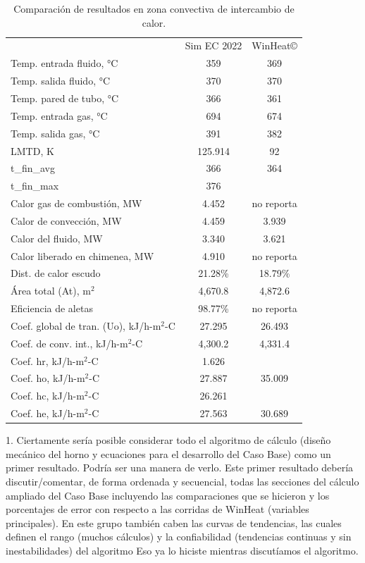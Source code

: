 \begin{table}
\begin{center}
\caption[Resultados en zona convectiva de intercambio de calor]{Comparación de resultados en zona convectiva de intercambio de calor.}
\label{tbl:compara-zc}
\begin{tabular}{l|c|c}
	& Sim EC 2022 & WinHeat\copyright \\
Temp. entrada fluido, °C		& 359 & 369	\\
Temp. salida fluido, °C			& 370 & 370	\\
Temp. pared de tubo, °C			& 366 & 361	\\

Temp. entrada gas, °C			& 694 & 674	\\
Temp. salida gas, °C			& 391 & 382	\\
LMTD, K							& 125.914 & 92 \\  
	t_fin_avg & 366 & 364\\
	t_fin_max & 376 & \\

Calor gas de combustión, MW		& 4.452 & no reporta \\
Calor de convección, MW			& 4.459 & 3.939	\\
Calor del fluido, MW			& 3.340 & 3.621	\\
Calor liberado en chimenea, MW	& 4.910 & no reporta \\

Dist. de calor escudo			& 21.28\% &  18.79\% \\

Área total (At), m$^2$			& 4,670.8 & 4,872.6 \\
Eficiencia de aletas			& 98.77\% & no reporta \\

Coef. global de tran. (Uo), kJ/h-m$^2$-C	& 27.295 & 26.493 \\
Coef. de conv. int., kJ/h-m$^2$-C	& 4,300.2 & 4,331.4 \\
Coef. hr, kJ/h-m$^2$-C			& 1.626 \\
Coef. ho, kJ/h-m$^2$-C			& 27.887 & 35.009 \\
Coef. hc, kJ/h-m$^2$-C			& 26.261 \\
Coef. he, kJ/h-m$^2$-C			& 27.563 & 30.689 \\
\end{tabular}
\end{center}
\end{table}
1.    Ciertamente sería posible considerar todo el algoritmo de cálculo (diseño mecánico del horno y ecuaciones para el desarrollo del Caso Base) como un primer resultado. Podría ser una manera de verlo. 
Este primer resultado debería discutir/comentar, de forma ordenada y secuencial, todas las secciones del cálculo ampliado del Caso Base incluyendo las comparaciones que se hicieron y los porcentajes de error con respecto a las corridas de WinHeat (variables principales). En este grupo también caben las curvas de tendencias, las cuales definen el rango (muchos cálculos) y la confiabilidad (tendencias continuas y sin inestabilidades) del algoritmo
Eso ya lo hiciste mientras discutíamos el algoritmo. 

